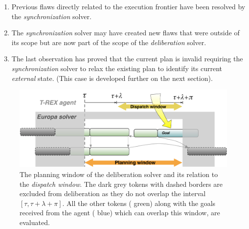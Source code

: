 \begin{enumerate}

\item Previous flaws directly related to the execution frontier have
  been resolved by the {\em synchronization} solver.

\item The {\em synchronization} solver may have created new flaws that
  were outside of its scope but are now part of the scope of the {\em
    deliberation} solver.

\item The last observation has proved that the current plan is invalid
  requiring the {\em synchronization} solver to relax the existing
  plan to identify its current {\em external} state. (This case is
  developed further on the next section).

\end{enumerate}

\begin{figure}[!htbp]
  \centering
  \includegraphics[width=0.65\columnwidth]{figs/plan_window}
  \caption{\small The planning window of the deliberation solver and
    its relation to the {\em dispatch window}. The dark grey tokens
    with dashed borders are excluded from deliberation as they do not
    overlap the interval $[\tau, \tau+\lambda+\pi]$. All the other
    tokens ({\color{green} green}) along with the goals received from
    the agent ({\color{blue} blue}) which can overlap this window, are
    evaluated.}
  \label{fig:plan:window}
\end{figure}


